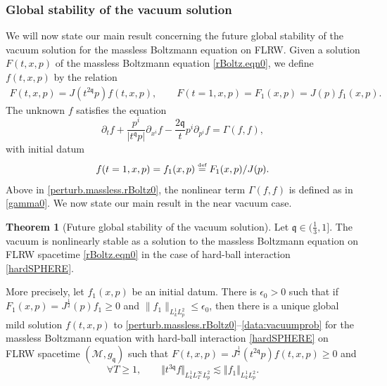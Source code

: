 \documentclass[reqno]{amsart}
\newcommand{\eqdef }{\overset{\mbox{\tiny{def}}}{=}}
\newcommand{\pv}{p}
\def\norm#1{\big\Vert#1\big\Vert}
\newcommand{\qq}{\mathfrak{q}}
\newcommand{\tq}{t^{\qq}}
\newcommand{\tqq}{t^{2\qq}}
\theoremstyle{definition}
\newtheorem{theorem}{Theorem}
\numberwithin{equation}{section}
\numberwithin{theorem}{section}
\begin{document}
\subsubsection{Global stability of the vacuum solution}

We will now state our main result concerning the future global stability of the vacuum solution for the massless Boltzmann equation on FLRW. Given a solution \(F(t,x,p)\) of the massless Boltzmann equation \eqref{rBoltz.eqn0}, we define \(f(t,x,p)\) by the relation   
\begin{align*}
    F(t,x,\pv) = J(\tqq \pv) f(t,x,\pv), \qquad 
    F(t=1,x,\pv) =F_1(x,\pv) = J( \pv) f_1(x,\pv).
\end{align*}
The unknown \(f\) satisfies the equation
\begin{equation}\label{perturb.massless.rBoltz0}
   \partial_t f+ \frac{\pv^i}{|\tq \pv|} \partial_{x^i} f
    -\frac{2\qq }{t} p^i\partial_{p^i} f = \Gamma(f,f),
\end{equation}
with initial datum 
\begin{equation}\label{data:vacuumprob}
    f(t=1, x, p) = f_1(x,p)\eqdef F_1(x,\pv)/J( \pv).
\end{equation}
Above in \eqref{perturb.massless.rBoltz0}, the nonlinear term $\Gamma(f,f)$ is defined as in \eqref{gamma0}. We now state our main result in the near vacuum case.  

\begin{theorem}[Future global stability of the vacuum solution]\label{thmvacuum}
    Let \(\qq\in (\frac{1}{3},1]\). The vacuum is nonlinearly stable as a solution to the massless Boltzmann equation on FLRW spacetime \eqref{rBoltz.eqn0} in the case of hard-ball interaction \eqref{hardSPHERE}.
    
    More precisely, let \(f_1(x,p)\) be an initial datum. There is \(\epsilon_0>0\) such that if \(F_1(x,p)=J^{\frac{1}{2}}(p)f_1\geq 0\) and \(\|f_1\|_{L^1_kL^2_{\pv}}\leq \epsilon_0\), then there is a unique global mild solution \(f(t,x,p)\) to \eqref{perturb.massless.rBoltz0}--\eqref{data:vacuumprob} for the massless Boltzmann equation with hard-ball interaction \eqref{hardSPHERE} on FLRW spacetime \((\mathcal{M},g_{\qq})\) such that \(F(t,x,p)=J^{\frac{1}{2}}(t^{2\qq}p)f(t,x,p)\geq 0\) and 
\begin{equation}\label{apriorivacuumestimate0}
\forall T\geq 1,\qquad {\norm{t^{3\qq} f}_{L^1_kL^\infty_TL^2_{\pv}}}
\lesssim 
\norm{f_1}_{L^1_kL^2_{\pv}}.    
\end{equation}
\end{theorem}
\end{document}
